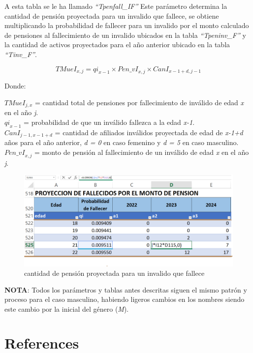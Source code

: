 \documentclass[
  letterpaper,
  DIV=11,
  numbers=noendperiod]{scrreprt}
\newlength{\cslhangindent}
\newlength{\cslentryspacingunit} %
\newenvironment{CSLReferences}[2] %
 {%
  \setlength{\parindent}{0pt}
  \ifodd #1
  \let\oldpar\par
  \def\par{\hangindent=\cslhangindent\oldpar}
  \fi
  \setlength{\parskip}{#2\cslentryspacingunit}
 }%
 {}
\begin{document}
A esta tabla se le ha llamado \emph{``Tpenfall\_IF''} Este parámetro
determina la cantidad de pensión proyectada para un invalido que
fallece, se obtiene multiplicando la probabilidad de fallecer para un
invalido por el monto calculado de pensiones al fallecimiento de un
invalido ubicados en la tabla \emph{``Tpeninv\_F''} y la cantidad de
activos proyectados para el año anterior ubicado en la tabla
\emph{``Tinv\_F''}.

\begin{equation}
{TMueI}_{x,j}={qi}_{x-1}\times{Pen\_vI}_{x,j}\times{CanI}_{x-1+d,j-1}
\end{equation}

Donde:

\({TMueI}_{j,x}\) = cantidad total de pensiones por fallecimiento de
inválido de edad \emph{x} en el año \emph{j}.\\
\({qi}_{x-1}\) = probabilidad de que un inválido fallezca a la edad
\emph{x-1}.\\
\(Ca{nI}_{j-1,x-1+d}\) = cantidad de afiliados inválidos proyectada de
edad de \emph{x-1+d} años para el año anterior, \emph{d = 0} en caso
femenino y \emph{d = 5} en caso masculino.\\
\({Pen\_vI}_{x,j}\) = monto de pensión al fallecimiento de un inválido
de edad \emph{x} en el año \emph{j}.

\begin{figure}

{\centering \includegraphics{images/F/Img41.png}

}

\caption{cantidad de pensión proyectada para un invalido que fallece}

\end{figure}

\textbf{NOTA}: Todos los parámetros y tablas antes descritas siguen el
mismo patrón y proceso para el caso masculino, habiendo ligeros cambios
en los nombres siendo este cambio por la inicial del género (\emph{M}).


\hypertarget{references}{%
\chapter*{References}\label{references}}


\hypertarget{refs}{}
\begin{CSLReferences}{0}{0}
\end{CSLReferences}
\end{document}
